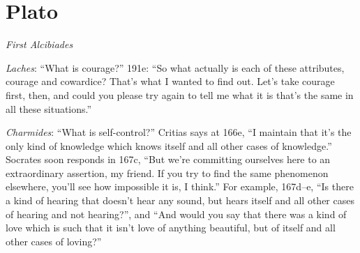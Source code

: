 \documentclass{article}
\theoremstyle{definition}
\begin{document}
\section{Plato}
{\em First Alcibiades}

{\em Laches}: ``What is courage?'' 191e: ``So what actually is each of these attributes, courage and cowardice?
That's what I wanted to find out. Let's take courage first, then, and could you please try again to tell me what it is
that's the same in all these situations.'' \cite[p.~53]{waterfieldmeno}

{\em Charmides}: ``What is self-control?''
Critias says at 166e, ``I maintain that it's the only kind of knowledge which knows itself and all other cases of knowledge.'' \cite[p.~21]{waterfieldmeno}
Socrates soon responds in 167c, ``But we're committing ourselves here to an extraordinary assertion, my friend. If you try to find the same phenomenon elsewhere,
you'll see how impossible it is, I think.'' For example, 167d--e, ``Is there a kind of hearing that doesn't hear any sound, but hears itself and all other cases of hearing
and not hearing?'', and ``And would you say that there was a kind of love which is such that it isn't love of anything beautiful, but of itself and all other cases of loving?''
\end{document}
